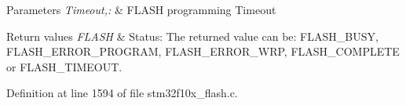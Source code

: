 \begin{DoxyParams}{Parameters}
{\em Timeout,\-:} & F\-L\-A\-S\-H programming Timeout \\
\hline
\end{DoxyParams}

\begin{DoxyRetVals}{Return values}
{\em F\-L\-A\-S\-H} & Status\-: The returned value can be\-: F\-L\-A\-S\-H\-\_\-\-B\-U\-S\-Y, F\-L\-A\-S\-H\-\_\-\-E\-R\-R\-O\-R\-\_\-\-P\-R\-O\-G\-R\-A\-M, F\-L\-A\-S\-H\-\_\-\-E\-R\-R\-O\-R\-\_\-\-W\-R\-P, F\-L\-A\-S\-H\-\_\-\-C\-O\-M\-P\-L\-E\-T\-E or F\-L\-A\-S\-H\-\_\-\-T\-I\-M\-E\-O\-U\-T. \\
\hline
\end{DoxyRetVals}


Definition at line 1594 of file stm32f10x\-\_\-flash.\-c.

